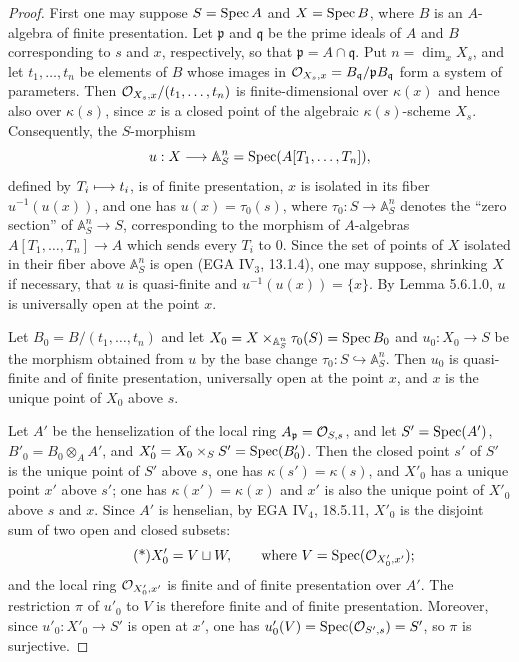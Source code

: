\begin{proof}
First one may suppose $S=\operatorname{Spec} A$ and $X=\operatorname{Spec} B$, where $B$ is an $A$-algebra of finite presentation. Let $\mathfrak p$ and $\mathfrak q$ be the prime ideals of $A$ and $B$ corresponding to $s$ and $x$, respectively, so that $\mathfrak p=A\cap\mathfrak q$. Put $n=\dim_xX_s$, and let $t_1,\ldots,t_n$ be elements of $B$ whose images in $\mathcal{O}_{X_s,x}=B_{\mathfrak q}/\mathfrak pB_{\mathfrak q}$ form a system of parameters. Then $\mathcal{O}_{X_s,x}/(t_1,\ldots,t_n)$ is finite-dimensional over $\kappa(x)$ and hence also over $\kappa(s)$, since $x$ is a closed point of the algebraic $\kappa(s)$-scheme $X_s$. Consequently, the $S$-morphism
\[
u:X\longrightarrow\mathbb A_S^n=\operatorname{Spec}(A[T_1,\ldots,T_n]),
\]
defined by $T_i\longmapsto t_i$, is of finite presentation, $x$ is isolated in its fiber $u^{-1}(u(x))$, and one has $u(x)=\tau_0(s)$, where $\tau_0:S\to\mathbb A_S^n$ denotes the ``zero section'' of $\mathbb A_S^n\to S$, corresponding to the morphism of $A$-algebras $A[T_1,\ldots,T_n]\to A$ which sends every $T_i$ to $0$. Since the set of points of $X$ isolated in their fiber above $\mathbb A_S^n$ is open (EGA IV$_3$, 13.1.4), one may suppose, shrinking $X$ if necessary, that $u$ is quasi-finite and $u^{-1}(u(x))=\{x\}$. By Lemma 5.6.1.0, $u$ is universally open at the point $x$.

Let $B_0=B/(t_1,\ldots,t_n)$ and let $X_0=X\times_{\mathbb A_S^n}\tau_0(S)=\operatorname{Spec} B_0$ and $u_0:X_0\to S$ be the morphism obtained from $u$ by the base change $\tau_0:S\hookrightarrow\mathbb A_S^n$. Then $u_0$ is quasi-finite and of finite presentation, universally open at the point $x$, and $x$ is the unique point of $X_0$ above $s$.

Let $A'$ be the henselization of the local ring $A_{\mathfrak p}=\mathcal{O}_{S,s}$, and let $S'=\operatorname{Spec}(A')$, $B'_0=B_0\otimes_AA'$, and $X'_0=X_0\times_SS'=\operatorname{Spec}(B'_0)$. Then the closed point $s'$ of $S'$ is the unique point of $S'$ above $s$, one has $\kappa(s')=\kappa(s)$, and $X'_0$ has a unique point $x'$ above $s'$; one has $\kappa(x')=\kappa(x)$ and $x'$ is also the unique point of $X'_0$ above $s$ and $x$. Since $A'$ is henselian, by EGA IV$_4$, 18.5.11, $X'_0$ is the disjoint sum of two open and closed subsets:
\[
\tag{*}
X'_0=V\sqcup W,\qquad\text{where }V=\operatorname{Spec}(\mathcal{O}_{X'_0,x'});
\]
and the local ring $\mathcal{O}_{X'_0,x'}$ is finite and of finite presentation over $A'$. The restriction $\pi$ of $u'_0$ to $V$ is therefore finite and of finite presentation. Moreover, since $u'_0:X'_0\to S'$ is open at $x'$, one has $u'_0(V)=\operatorname{Spec}(\mathcal{O}_{S',s})=S'$, so $\pi$ is surjective.


\end{proof}
